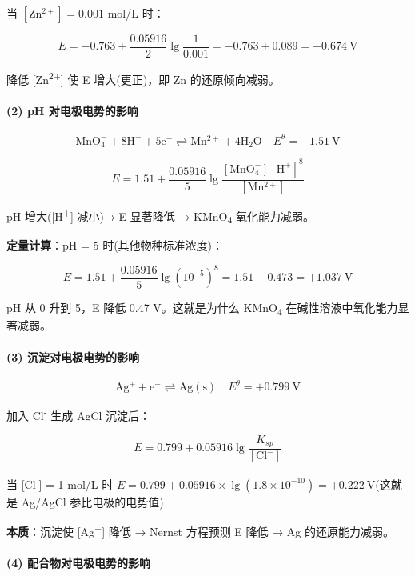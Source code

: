 \documentclass[a4paper,11pt]{ctexart}
\begin{document}
当 \([\mathrm{Zn^{2+}}] = 0.001\) mol/L 时：

\[
E = -0.763 + \frac{0.05916}{2}\lg\frac{1}{0.001} = -0.763 + 0.089 = -0.674\ \mathrm{V}
\]

降低 {[}Zn\textsuperscript{2+}{]} 使 E 增大(更正)，即 Zn 的还原倾向减弱。

\paragraph{(2) pH 对电极电势的影响}\label{ph-ux5bf9ux7535ux6781ux7535ux52bfux7684ux5f71ux54cd}

\[
\mathrm{MnO_4^- + 8H^+ + 5e^- \rightleftharpoons Mn^{2+} + 4H_2O} \quad E^\theta = +1.51\ \mathrm{V}
\]

\[
E = 1.51 + \frac{0.05916}{5}\lg\frac{[\mathrm{MnO_4^-}][\mathrm{H^+}]^8}{[\mathrm{Mn^{2+}}]}
\]

pH 增大({[}H\textsuperscript{+}{]} 减小)→ E 显著降低 → KMnO\textsubscript{4} 氧化能力减弱。

\textbf{定量计算}：pH = 5 时(其他物种标准浓度)：

\[E = 1.51 + \frac{0.05916}{5}\lg(10^{-5})^8 = 1.51 - 0.473 = +1.037\ \mathrm{V}\]

pH 从 0 升到 5，E 降低 0.47 V。这就是为什么 KMnO\textsubscript{4} 在碱性溶液中氧化能力显著减弱。

\paragraph{(3) 沉淀对电极电势的影响}\label{ux6c89ux6dc0ux5bf9ux7535ux6781ux7535ux52bfux7684ux5f71ux54cd}

\[
\mathrm{Ag^+ + e^- \rightleftharpoons Ag(s)} \quad E^\theta = +0.799\ \mathrm{V}
\]

加入 Cl\textsuperscript{-} 生成 AgCl 沉淀后：

\[
E = 0.799 + 0.05916\lg\frac{K_{sp}}{[\mathrm{Cl^-}]}
\]

当 {[}Cl\textsuperscript{-}{]} = 1 mol/L 时 \(E = 0.799 + 0.05916 \times \lg(1.8 \times 10^{-10}) = +0.222\ \mathrm{V}\)(这就是 Ag/AgCl 参比电极的电势值)

\textbf{本质}：沉淀使 {[}Ag\textsuperscript{+}{]} 降低 → Nernst 方程预测 E 降低 → Ag 的还原能力减弱。

\paragraph{(4) 配合物对电极电势的影响}\label{ux914dux5408ux7269ux5bf9ux7535ux6781ux7535ux52bfux7684ux5f71ux54cd}
\end{document}
